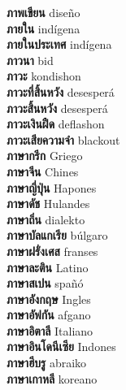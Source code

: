 \textbf{ ภาพเขียน  } diseño \\
\textbf{ ภายใน  } indígena \\
\textbf{ ภายในประเทศ  } indígena \\
\textbf{ ภาวนา  } bid \\
\textbf{ ภาวะ  } kondishon \\
\textbf{ ภาวะที่สิ้นหวัง  } desesperá \\
\textbf{ ภาวะสิ้นหวัง  } desesperá \\
\textbf{ ภาวะเงินฝืด  } deflashon \\
\textbf{ ภาวะเสียความจำ  } blackout \\
\textbf{ ภาษากรีก  } Griego \\
\textbf{ ภาษาจีน  } Chines \\
\textbf{ ภาษาญี่ปุ่น  } Hapones \\
\textbf{ ภาษาดัช  } Hulandes \\
\textbf{ ภาษาถิ่น  } dialekto \\
\textbf{ ภาษาบัลแกเรีย  } búlgaro \\
\textbf{ ภาษาฝรั่งเศส  } franses \\
\textbf{ ภาษาละติน  } Latino \\
\textbf{ ภาษาสเปน  } spañó \\
\textbf{ ภาษาอังกฤษ  } Ingles \\
\textbf{ ภาษาอัฟกัน  } afgano \\
\textbf{ ภาษาอิตาลี  } Italiano \\
\textbf{ ภาษาอินโดนีเซีย  } Indones \\
\textbf{ ภาษาฮีบรู  } abraiko \\
\textbf{ ภาษาเกาหลี  } koreano \\
